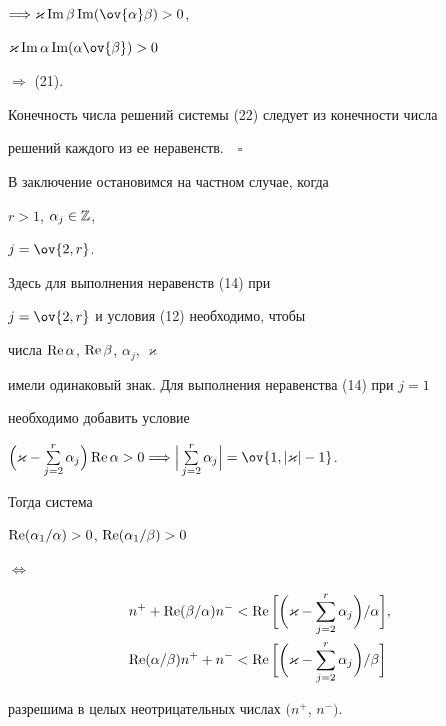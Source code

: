 $\Longrightarrow


\varkappa\im\beta\im(\ov{\alpha}\beta)>0$,


$\varkappa\im\alpha\im(\alpha\ov{\beta})>0$


$\Longrightarrow$ (21).


Конечность числа решений системы (22) следует из конечности числа


решений каждого из ее неравенств.$\quad\square$





В заключение остановимся на частном случае, когда


$r>1$, $\alpha_j \in\Bbb Z$,


$j=\ov{2,r}$.


Здесь для выполнения неравенств (14) при


$j=\ov{2,r}$ и условия (12) необходимо, чтобы


числа $\operatorname{Re}\alpha$, $\operatorname{Re}\beta$, $\alpha_{j}$, $\varkappa$


имели одинаковый знак. Для выполнения неравенства (14) при $j=1$


необходимо добавить условие


$\Big(\varkappa - \sum\limits_{j=2}^{r}\alpha_{j}\Big)\re\alpha >0


\Longrightarrow


\Big|\sum\limits_{j=2}^{r}\alpha_{j}\Big|=\ov{1,|\varkappa|-1}$.


Тогда система


$\operatorname{Re} (\alpha _{1}/\alpha) > 0$, $\operatorname{Re} (\alpha _{1}/\beta) > 0$


$\Longleftrightarrow$


\begin{equation}


\begin{split}


n^{+} +\re(\beta/\alpha)n^{-}&<\re\bigg[\bigg(\varkappa -


\sum_{j=2}^{r}\alpha_{j}\bigg)/\alpha\bigg],\\


%


\re(\alpha/\beta)n^{+} + n^{-}&<\re\bigg[\bigg(\varkappa


-\sum_{j=2}^{r}\alpha_{j}\bigg)/\beta\bigg]


\end{split}


\end{equation}


разрешима в целых неотрицательных числах $(n^{+}$, $n^{-})$.



